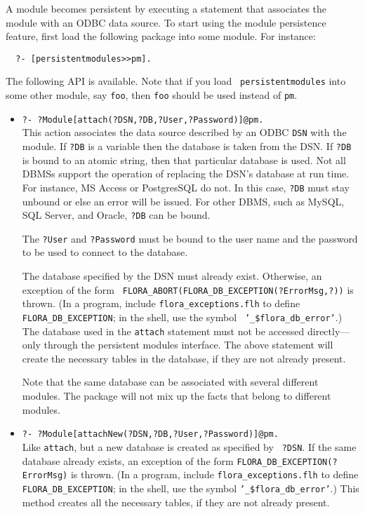 A module becomes persistent by executing a statement that associates the
module with an ODBC data source. To start using the module persistence
feature, first load the following package into some module. For instance:
\begin{verbatim}
  ?- [persistentmodules>>pm].
\end{verbatim}
The following API is available. Note that if you load {\tt
  persistentmodules} into some other module, say {\tt foo}, then {\tt foo}
should be used instead of {\tt pm}.    
\begin{itemize}
\item {\tt ?- ?Module[attach(?DSN,?DB,?User,?Password)]@pm.}\\
  This action associates the data source described by an ODBC {\tt DSN}
  with the module.  If {\tt ?DB} is a variable then the database is taken
  from the DSN. If {\tt ?DB} is bound to an atomic string, then that particular
  database is used. Not all DBMSs support the operation of replacing the
  DSN's database at run time. For instance, MS Access or PostgresSQL do not.
  In this case, {\tt ?DB} must stay unbound or else an error will be issued.
  For other DBMS, such as MySQL, SQL Server, and Oracle, {\tt ?DB} can be
  bound. 

  The {\tt ?User} and {\tt ?Password} must be bound to the user name and
  the password to be used to connect to the database.

  The database specified by the DSN must already exist. Otherwise, an
  exception of the form {\tt
    FLORA\_ABORT(FLORA\_DB\_EXCEPTION(?ErrorMsg,?))} is thrown.  (In a
  program, include {\tt flora\_exceptions.flh} to define {\tt
    FLORA\_DB\_EXCEPTION}; in the shell, use the symbol {\tt
    '\_\$flora\_db\_error'}.)  The database used in the {\tt attach}
  statement must not be accessed directly---only through the persistent
  modules interface.  The above statement will create the necessary tables
  in the database, if they are not already present.

  Note that the same database can be associated with several different
  modules. The package will not mix up the facts that belong to different
  modules.
\item {\tt ?- ?Module[attachNew(?DSN,?DB,?User,?Password)]@pm.}\\
  Like {\tt attach}, but a new database is created as specified by {\tt
    ?DSN}.  If the same database already exists, an exception of the form
  {\tt FLORA\_DB\_EXCEPTION(?ErrorMsg)} is thrown.  (In a program, include
  {\tt flora\_exceptions.flh} to define {\tt FLORA\_DB\_EXCEPTION}; in the
  shell, use the symbol {\tt '\_\$flora\_db\_error'}.)  This method creates
  all the necessary tables, if they are not already present.
  

\end{itemize}

